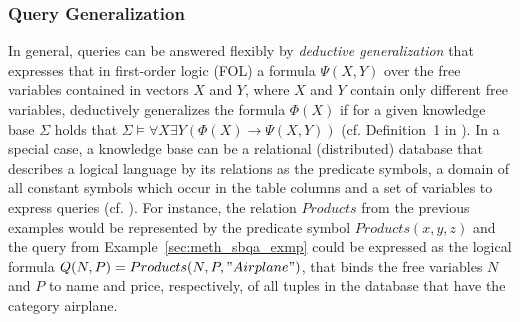 \subsubsection{Query Generalization}
In general, queries can be answered flexibly by \emph{deductive generalization} \citep{Gaasterland1992, Wiese2014} that expresses that in first-order logic
(FOL) a formula $\Psi(X,Y)$ over the free variables contained in vectors $X$ and $Y$, where $X$ and $Y$ contain only different free variables, deductively
generalizes the formula $\Phi(X)$ if for a given knowledge base $\Sigma$ holds that $\Sigma \vDash \forall X \exists Y (\Phi(X) \to \Psi(X,Y))$ 
(cf. Definition~1 in \cite{Wiese2014}). In a special case, a knowledge base can be a relational (distributed) database that describes a logical language by
its relations as the predicate symbols, a domain of all constant symbols which occur in the table columns and a set of variables to express queries 
(cf. \cite{Wiese2014}). For instance, the relation $Products$ from the previous examples would be represented by the predicate symbol $Products(x,y,z)$
and the query from Example~\ref{sec:meth_sbqa_exmp} could be expressed as the logical formula $Q(N,P)=Products(N,P,"Airplane")$, that binds the free 
variables $N$ and $P$ to name and price, respectively, of all tuples in the database that have the category airplane. 

